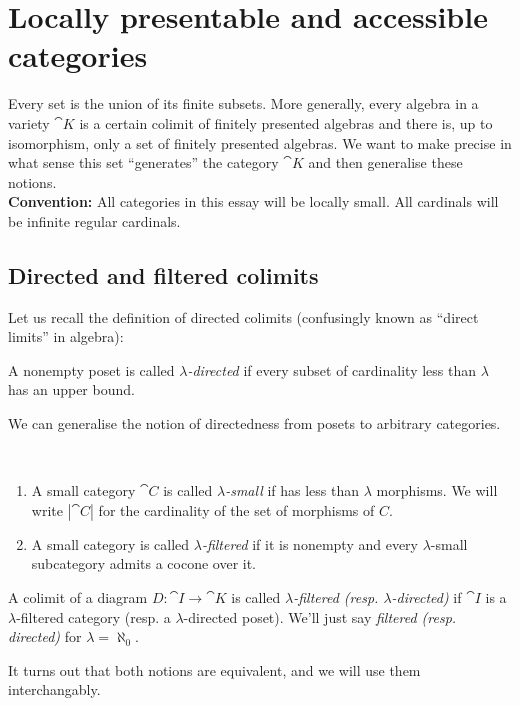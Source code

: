 \section{Locally presentable and accessible categories}
\label{sec:presentableaccessible}

Every set is the union of its finite subsets. More generally, every algebra in a variety $\cat K$ is a certain colimit of finitely presented algebras and there is, up to isomorphism, only a set of finitely presented algebras. We want to make precise in what sense this set ``generates'' the category $\cat K$ and then generalise these notions. \\ %

\textbf{Convention: } All categories in this essay will be locally small. All cardinals will be infinite regular cardinals.

\subsection{Directed and filtered colimits}

Let us recall the definition of directed colimits (confusingly known as ``direct limits'' in algebra):
\begin{Definition}
A nonempty poset is called \emph{$\lambda$-directed} if every subset of cardinality less than $\lambda$ has an upper bound.
\end{Definition}

We can generalise the notion of directedness from posets to arbitrary categories.

\begin{Definition}\
\begin{enumerate}
\item A small category $\cat C$ is called \emph{$\lambda$-small} if has less than $\lambda$ morphisms. We will write $|\cat C|$ for the cardinality of the set of morphisms of $C$. 
\item A small category is called \emph{$\lambda$-filtered} if it is nonempty and every $\lambda$-small subcategory admits a cocone over it. 
\end{enumerate}
A colimit of a diagram $D : \cat I \to \cat K$ is called \emph{$\lambda$-filtered (resp. $\lambda$-directed)} if $\cat I$ is a $\lambda$-filtered category (resp. a $\lambda$-directed poset). We'll just say \emph{filtered (resp. directed)} for $\lambda = \aleph_0$.
\end{Definition}

It turns out that both notions are equivalent, and we will use them interchangably.

